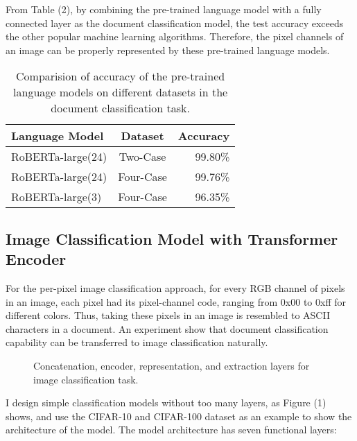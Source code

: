 \documentclass[runningheads]{llncs}
\begin{document}
From Table (2), by combining the pre-trained language model with a fully connected layer as the document classification model,
the test accuracy exceeds the other popular machine learning algorithms.
Therefore, the pixel channels of an image can be properly represented by these pre-trained language models.

\begin{table}
\begin{center}
\begin{tabular}{|l|c|r|}
\hline
Language Model 	& Dataset & Accuracy \\
\hline\hline
RoBERTa-large(24) & Two-Case	&	99.80\% \\
RoBERTa-large(24) & Four-Case	&	99.76\% \\
RoBERTa-large(3)  & Four-Case	&	96.35\% \\
\hline
\end{tabular}
\end{center}
\caption{Comparision of accuracy of the pre-trained language models on different datasets in the document classification task.}
\end{table}


\subsection{Image Classification Model with Transformer Encoder}


For the per-pixel image classification approach, for every RGB channel of pixels in an image,
each pixel had its pixel-channel code, ranging from 0x00 to 0xff for different colors.
Thus, taking these pixels in an image is resembled to ASCII characters in a document.
An experiment show that document classification capability can be transferred to image classification naturally.

\begin{figure*}
\begin{center}
\end{center}
   \caption{Concatenation, encoder, representation, and extraction layers for image classification task.}
\label{fig:short}
\end{figure*}

I design simple classification models without too many layers, as Figure (1) shows,
and use the CIFAR-10 and CIFAR-100 dataset as an example to show the architecture of the model.
The model architecture has seven functional layers:
\end{document}
